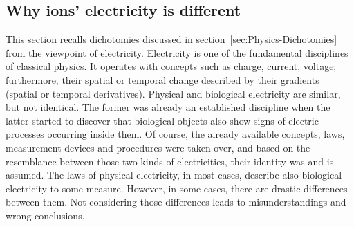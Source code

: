 \subsection[Why different]{Why ions' electricity is different\label{sec:PHYSICS_ElectricWhyDifferent}}

This section recalls dichotomies discussed in section~\ref{sec:Physics-Dichotomies} from the viewpoint of electricity.
Electricity is one of the fundamental disciplines of classical physics. It operates with concepts such as charge, current, voltage; furthermore, their
spatial or temporal change described by their gradients (spatial or temporal derivatives).
Physical and biological electricity are similar, but not identical.
The former was already an established discipline when the latter
started to discover that biological objects also show signs of electric processes occurring inside them.
Of course, the already available concepts, laws, measurement devices and procedures were taken over, and based on the resemblance between those two kinds of electricities, their identity was and is assumed.
The laws of physical electricity, in most cases, describe also biological electricity to some measure. 
However, in some cases, there are drastic differences between them.
Not considering those differences leads to misunderstandings and wrong conclusions.

